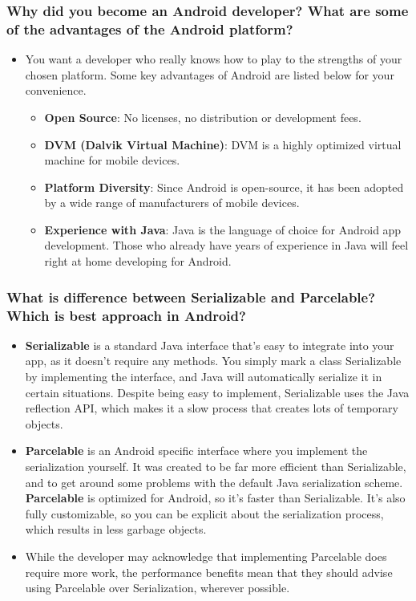 \documentclass[9pt, b5paper]{article}
\begin{document}
\subsubsection{Why did you become an Android developer? What are some of the advantages of the Android platform?}
\label{sec-1-1-7}
\begin{itemize}
\item You want a developer who really knows how to play to the strengths of your chosen platform. Some key advantages of Android are listed below for your convenience.
\begin{itemize}
\item \textbf{Open Source}: No licenses, no distribution or development fees.
\item \textbf{DVM (Dalvik Virtual Machine)}: DVM is a highly optimized virtual machine for mobile devices.
\item \textbf{Platform Diversity}: Since Android is open-source, it has been adopted by a wide range of manufacturers of mobile devices.
\item \textbf{Experience with Java}: Java is the language of choice for Android app development. Those who already have years of experience in Java will feel right at home developing for Android.
\end{itemize}
\end{itemize}
\subsubsection{What is difference between Serializable and Parcelable? Which is best approach in Android?}
\label{sec-1-1-8}
\begin{itemize}
\item \textbf{Serializable} is a standard Java interface that's easy to integrate into your app, as it doesn't require any methods. You simply mark a class Serializable by implementing the interface, and Java will automatically serialize it in certain situations. Despite being easy to implement, Serializable uses the Java reflection API, which makes it a slow process that creates lots of temporary objects.
\item \textbf{Parcelable} is an Android specific interface where you implement the serialization yourself. It was created to be far more efficient than Serializable, and to get around some problems with the default Java serialization scheme. \textbf{Parcelable} is optimized for Android, so it's faster than Serializable. It's also fully customizable, so you can be explicit about the serialization process, which results in less garbage objects.
\item While the developer may acknowledge that implementing Parcelable does require more work, the performance benefits mean that they should advise using Parcelable over Serialization, wherever possible.
\end{itemize}
\end{document}
